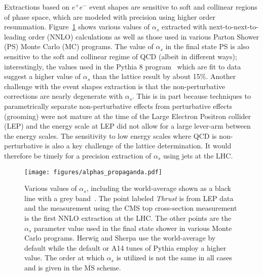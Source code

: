 

Extractions based on $e^+e^-$ event shapes are sensitive to soft and collinear regions of phase space, which are modeled with precision using higher order resummation.  Figure~\ref{fig:propaganda} shows various values of $\alpha_s$ extracted with next-to-next-to-leading order (NNLO) calculations as well as those used in various Parton Shower (PS) Monte Carlo (MC) programs.  The value of $\alpha_s$ in the final state PS is also sensitive to the soft and collinear regime of QCD (albeit in different ways); interestingly, the values used in the Pythia 8 program~\cite{Sjostrand:2006za,Sjostrand:2007gs} which are fit to data suggest a higher value of $\alpha_s$ than the lattice result by about 15\%.   Another challenge with the event shapes extraction is that the non-perturbative corrections are nearly degenerate with $\alpha_s$.   This is in part because techniques to parametrically separate non-perturbative effects from perturbative effects (grooming) were not mature at the time of the Large Electron Positron collider (LEP) and the energy scale at LEP did not allow for a large lever-arm between the energy scales.   The sensitivity to low energy scales where QCD is non-perturbative is also a key challenge of the lattice determination.  It would therefore be timely for a precision extraction of $\alpha_s$ using jets at the LHC.

\begin{figure}
\begin{center}
\texttt{[image: figures/alphas\_propaganda.pdf]}
\end{center}
\caption{Various values of $\alpha_s$, including the world-average shown as a black line with a grey band~\cite{Olive:2016xmw}.  The point labeled \textit{Thrust} is from LEP data and the measurement using the CMS top cross-section measurement is the first NNLO extraction at the LHC.  The other points are the $\alpha_s$ parameter value used in the final state shower in various Monte Carlo programs.  Herwig and Sherpa use the world-average by default while the default or A14 tunes of Pythia employ a higher value.  The order at which $\alpha_s$ is utilized is not the same in all cases and is given in the $\overline{\text{MS}}$ scheme. }
\label{fig:propaganda}
\end{figure}

